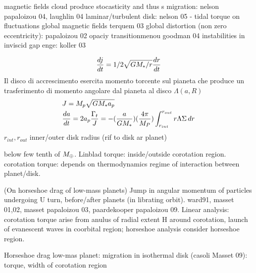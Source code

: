\begin{workout}
magnetic fields cloud produce stocasticity and thus s migration: nelson papaloizou 04, laughlin 04
laminar/turbulent disk: nelson 05 - tidal torque on fluctuations
global magnetic fields terquem 03
global distortion (non zero eccentricity): papaloizou 02
opaciy transitionmenou goodman 04
instabilities in inviscid gap enge: koller 03
\end{workout}

\begin{workout}
\begin{align}
\TDy{t}{j}=1/2\sqrt{GM_*/r}\TDy{t}{r}
\end{align}
Il disco di accrescimento esercita momento torcente sul pianeta che produce un trasferimento di momento angolare dal pianeta al disco $\Lambda(a,R)$
\begin{align*}
&J=M_p\sqrt{GM_*a_p}\\
&\TDy{t}{a}=2a_p\frac{\Gamma_t}{J}=-(\frac{a}{GM_*})(\frac{4\pi}{M_P})\int_{r_{int}}^{r_{out}}r\Lambda\Sigma\,dr
\end{align*}
$r_{int}, r_{out}$ inner/outer disk radius (rif to disk ar planet)
\end{workout}


\begin{workout}[M14:type I]
below few tenth of $\mearth{}$.
Linblad torque: inside/outside corotation region.
corotation torque: depends on thermodynamics regime of interaction between planet/disk.
\end{workout}

\begin{workout}
(On horseshoe drag of low-mass planets)
Jump in angular momentum of particles undergoing U turn, before/after planets (in librating orbit).
ward91, masset 01,02, masset papaloizou 03, paardekooper papaloizou 09.
Linear analysis: corotation torque arise from anulus of radial extent H around corotation, launch of evanescent waves in coorbital region; horseshoe analysis consider horseshoe region.
\end{workout}

\begin{workout}
Horseshoe drag low-mas planet: migration in isothermal disk (casoli Masset 09): torque, width of corotation region
\end{workout}

